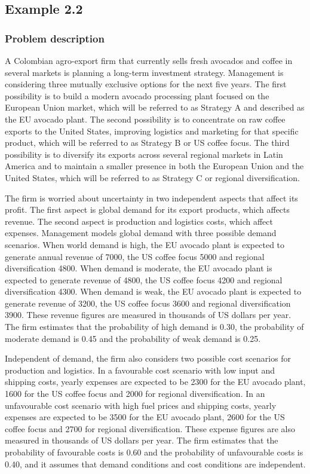 \subsection{Example 2.2}\label{sec:example2}
	
	\subsubsection{Problem description}\label{subsec:example2-problem}
	
	A Colombian agro-export firm that currently sells fresh avocados and coffee in several markets is planning a
	long-term investment strategy. Management is considering three mutually exclusive options for the next five years.
	The first possibility is to build a modern avocado processing plant focused on the European Union market, which will
	be referred to as Strategy A and described as the EU avocado plant. The second possibility is to concentrate on
	raw coffee exports to the United States, improving logistics and marketing for that specific product, which will be
	referred to as Strategy B or US coffee focus. The third possibility is to diversify its exports across several
	regional markets in Latin America and to maintain a smaller presence in both the European Union and the United States,
	which will be referred to as Strategy C or regional diversification.
	
	\medskip
	The firm is worried about uncertainty in two independent aspects that affect its profit. The first aspect is global
	demand for its export products, which affects revenue. The second aspect is production and logistics costs, which
	affect expenses. Management models global demand with three possible demand scenarios. When world demand is high,
	the EU avocado plant is expected to generate annual revenue of 7000, the US coffee focus 5000 and regional
	diversification 4800. When demand is moderate, the EU avocado plant is expected to generate revenue of 4800, the
	US coffee focus 4200 and regional diversification 4300. When demand is weak, the EU avocado plant is expected to
	generate revenue of 3200, the US coffee focus 3600 and regional diversification 3900. These revenue figures are
	measured in thousands of US dollars per year. The firm estimates that the probability of high demand is 0.30, the
	probability of moderate demand is 0.45 and the probability of weak demand is 0.25.
	
	\medskip
	Independent of demand, the firm also considers two possible cost scenarios for production and logistics. In a
	favourable cost scenario with low input and shipping costs, yearly expenses are expected to be 2300 for the EU
	avocado plant, 1600 for the US coffee focus and 2000 for regional diversification. In an unfavourable cost
	scenario with high fuel prices and shipping costs, yearly expenses are expected to be 3500 for the EU avocado plant,
	2600 for the US coffee focus and 2700 for regional diversification. These expense figures are also measured in
	thousands of US dollars per year. The firm estimates that the probability of favourable costs is 0.60 and the
	probability of unfavourable costs is 0.40, and it assumes that demand conditions and cost conditions are independent.
	
